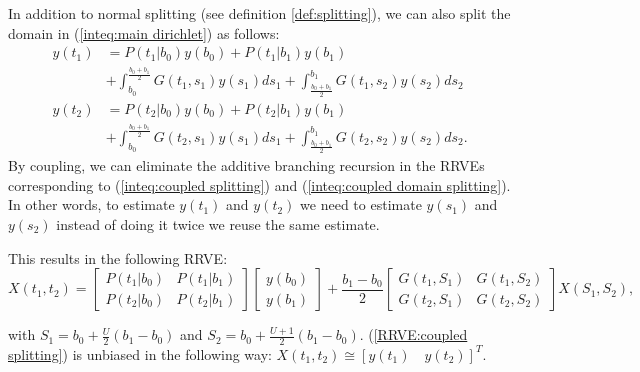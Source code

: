 \documentclass[a4paper,12pt]{article}
\begin{document}
\begin{example} \label{ex:coupled splitting}
  In addition to normal splitting (see definition \ref{def:splitting}),
  we can also split the domain in (\ref{inteq:main dirichlet})
  as follows:
  \begin{align}\label{inteq:coupled splitting}
    y(t_1) & = P(t_1|b_{0}) y(b_{0}) + P(t_1|b_{1}) y(b_{1})                \\
           & + \int_{b_{0}}^{\frac{b_{0}+b_{1}}{2}} G(t_1,s_1)y(s_1) ds_1 +
    \int_{\frac{b_{0}+b_{1}}{2}}^{b_{1}} G(t_1,s_2)y(s_2) ds_2              \\ \label{inteq:coupled domain splitting}
    y(t_2) & = P(t_2|b_{0}) y(b_{0}) + P(t_2|b_{1}) y(b_{1})                \\
           & + \int_{b_{0}}^{\frac{b_{0}+b_{1}}{2}} G(t_2,s_1)y(s_1) ds_1
    +\int_{\frac{b_{0}+b_{1}}{2}}^{b_{1}} G(t_2,s_2)y(s_2) ds_2.
  \end{align}
  By coupling, we can eliminate the additive branching recursion
  in the RRVEs corresponding to (\ref{inteq:coupled splitting})
  and (\ref{inteq:coupled domain splitting}). In other words,
  to estimate $y(t_1)$ and $y(t_2)$ we need to estimate $y(s_1)$ and $y(s_2)$
  instead of doing it twice we reuse the same estimate.

  This results in the following RRVE:
  \begin{equation} \label{RRVE:coupled splitting}
    X(t_{1},t_{2})=
    \begin{bmatrix}
      P(t_{1}|b_{0}) & P(t_{1}|b_{1}) \\
      P(t_{2}|b_{0}) & P(t_{2}|b_{1})
    \end{bmatrix}
    \begin{bmatrix}
      y(b_{0}) \\
      y(b_{1})
    \end{bmatrix}
    +
    \frac{b_{1}-b_{0}}{2}
    \begin{bmatrix}
      G(t_{1},S_{1}) & G(t_{1},S_{2}) \\
      G(t_{2},S_{1}) & G(t_{2},S_{2})
    \end{bmatrix}
    X(S_{1},S_{2}),
  \end{equation}

  with $S_{1} = b_{0} + \frac{U}{2} (b_{1} - b_{0}) $ and
  $S_{2} = b_{0} + \frac{U+1}{2} (b_{1} - b_{0}) $.
  (\ref{RRVE:coupled splitting}) is unbiased in the following way:
  $X(t_{1},t_{2}) \cong [y(t_{1}) \quad y(t_{2})]^{T}$.

\end{example}
\end{document}
